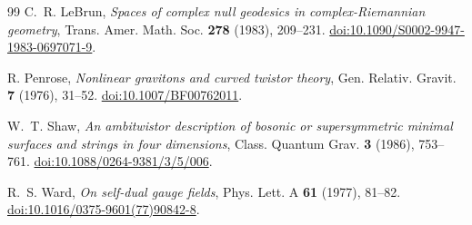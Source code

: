\documentclass[11pt]{article}
\numberwithin{equation}{section}
\theoremstyle{definition}
\theoremstyle{remark}
\begin{document}
\begin{thebibliography}{99}
C.~R. LeBrun,
\emph{Spaces of complex null geodesics in complex-Riemannian geometry},
Trans. Amer. Math. Soc. \textbf{278} (1983), 209--231.
\href{https://doi.org/10.1090/S0002-9947-1983-0697071-9}{doi:10.1090/S0002-9947-1983-0697071-9}.

R. Penrose,
\emph{Nonlinear gravitons and curved twistor theory},
Gen. Relativ. Gravit. \textbf{7} (1976), 31--52.
\href{https://doi.org/10.1007/BF00762011}{doi:10.1007/BF00762011}.

W.~T. Shaw,
\emph{An ambitwistor description of bosonic or supersymmetric minimal surfaces and strings in four dimensions},
Class. Quantum Grav. \textbf{3} (1986), 753--761.
\href{https://doi.org/10.1088/0264-9381/3/5/006}{doi:10.1088/0264-9381/3/5/006}.

R.~S. Ward,
\emph{On self-dual gauge fields},
Phys. Lett. A \textbf{61} (1977), 81--82.
\href{https://doi.org/10.1016/0375-9601(77)90842-8}{doi:10.1016/0375-9601(77)90842-8}.

\end{thebibliography}
\end{document}
